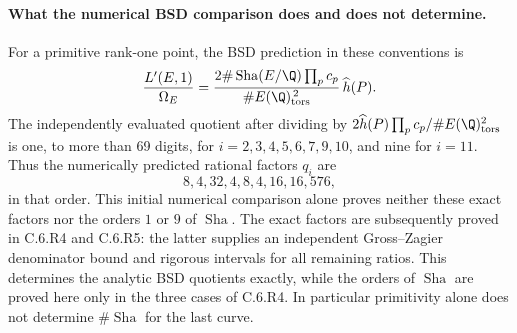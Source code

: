 \paragraph{What the numerical BSD comparison does and does not determine.}
For a primitive rank-one point, the BSD prediction in these conventions is
\[
 \frac{L'(E,1)}{\Omega_E}
 =\frac{2\#\operatorname{Sha}(E/\Q)\prod_pc_p}
        {\#E(\Q)_{\rm tors}^{\,2}}\,\widehat h(P).
\]
The independently evaluated quotient after dividing by
$2\widehat h(P)\prod_pc_p/\#E(\Q)_{\rm tors}^2$ is one, to
more than 69 digits, for $i=2,3,4,5,6,7,9,10$, and nine for
$i=11$. Thus the numerically predicted rational factors $q_i$ are
\[
 8,4,32,4,8,4,16,16,576,
\]
in that order. This initial numerical comparison alone proves neither
these exact factors nor the orders $1$ or $9$ of $\operatorname{Sha}$.
The exact factors are subsequently proved in C.6.R4 and C.6.R5:
the latter supplies an independent Gross--Zagier denominator bound
and rigorous intervals for all remaining ratios. This determines
the analytic BSD quotients exactly, while the orders of
$\operatorname{Sha}$ are proved here only in the three cases of
C.6.R4. In particular primitivity alone does not determine
$\#\operatorname{Sha}$ for the last curve.

